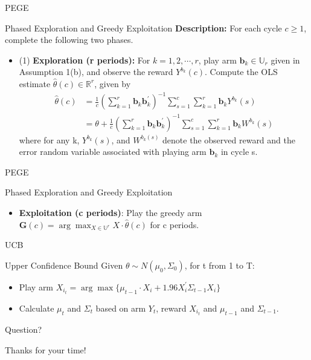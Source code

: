 \documentclass[serif]{beamer}
\begin{document}
\begin{frame}{PEGE}

\begin{block}{Phased Exploration and Greedy Exploitation}
\textbf{Description:} For each cycle $c\geq 1$, complete the following two phases.
\begin{itemize}
\item (1) \textbf{Exploration (r periods):} For $k=1,2,\cdots,r$, play arm $\textbf{b}_{k}\in \mathbb{U}_{r}$ given in Assumption 1(b), and observe the reward $Y^{b_{k}}(c)$. Compute the OLS estimate $\hat{\theta}(c)\in \mathbb{R}^{r}$, given by
\begin{align}
\hat{\theta}(c)&=\frac{1}{c}(\sum_{k=1}^{r}\textbf{b}_{k}\textbf{b}_{k}^{'})^{-1}\sum_{s=1}^{c}\sum_{k=1}^{r}\textbf{b}_{k}Y^{b_{k}}(s) \nonumber \\
&=\theta+\frac{1}{c}(\sum_{k=1}^{r}\textbf{b}_{k}\textbf{b}_{k}^{'})^{-1}\sum_{s=1}^{c}\sum_{k=1}^{r}\textbf{b}_{k}W^{b_{k}}(s) \nonumber 
\end{align}
where for any k, $Y^{b_{k}}(s)$, and $W^{b_{k}(s)}$ denote the observed reward and the error random variable associated with playing arm $\textbf{b}_{k}$ in cycle s.
\end{itemize}

\end{block}

\end{frame}


\begin{frame}{PEGE}

\begin{block}{Phased Exploration and Greedy Exploitation}
\begin{itemize}
\item \textbf{Exploitation (c periods)}: Play the greedy arm $\textbf{G}(c)=\arg \max_{X\in \mathbb{U}^{r}}X\cdot\hat{\theta}(c)$ for c periods.
\end{itemize}
\end{block}


\end{frame}
\begin{frame}{UCB}
\begin{block}{Upper Confidence Bound}
Given $\theta \sim N(\mu_{0},\Sigma_{0})$, for t from 1 to T:
\begin{itemize}
\item Play arm $X_{i_{t}}=\arg\max\{\mu_{t-1}\cdot X_{i} + 1.96X_{i}^{'}\Sigma_{t-1} X_{i}\}$
\item Calculate $\mu_{t}$ and $\Sigma_{t}$ based on arm $Y_{t}$, reward $X_{i_{t}}$ and $\mu_{t-1}$ and $\Sigma_{t-1}$.
\end{itemize}

\end{block}

\end{frame}






\begin{frame}{Question?}
\begin{center}
\Huge{Thanks for your time!}
\end{center}
\end{frame}
\end{document}
